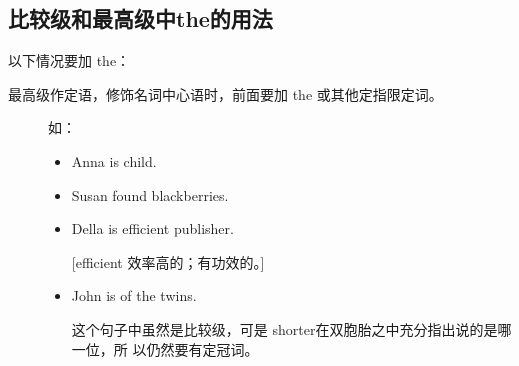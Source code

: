 \subsection{比较级和最高级中the的用法}
\label{subsec:themost}

以下情况要加 the：
\begin{description}
\item[最高级作定语，修饰名词中心语时，前面要加 the 或其他定指限定词。]如：

  \begin{itemize}
  \item Anna is  child.

  \item Susan found  blackberries.
  \item Della is  efficient publisher.

    [efficient  效率高的；有功效的。]

  \item  John is  of the twins.

    这个句子中虽然是比较级，可是 shorter在双胞胎之中充分指出说的是哪一位，所
    以仍然要有定冠词。
  \end{itemize}
\end{description}

